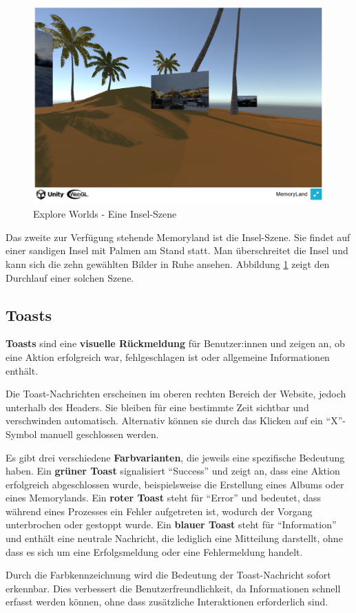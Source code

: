 \begin{figure} [h t]
    \centering
    \includegraphics[scale=0.5]{pics/explore_worlds_island.PNG}
    \caption{Explore Worlds - Eine Insel-Szene}
    \label{fig:explore-worlds-island}
\end{figure}



Das zweite zur Verfügung stehende Memoryland ist die Insel-Szene. Sie findet auf einer sandigen Insel mit Palmen am Stand statt. Man überschreitet die Insel und kann sich die zehn gewählten Bilder in Ruhe ansehen. Abbildung \ref{fig:explore-worlds-island} zeigt den Durchlauf einer solchen Szene.


\subsection{Toasts}

\textbf{Toasts} sind eine \textbf{visuelle Rückmeldung} für Benutzer:innen und zeigen an, ob eine Aktion erfolgreich war, fehlgeschlagen ist oder allgemeine Informationen enthält.  

Die Toast-Nachrichten erscheinen im oberen rechten Bereich der Website, jedoch unterhalb des Headers. Sie bleiben für eine bestimmte Zeit sichtbar und verschwinden automatisch. Alternativ können sie durch das Klicken auf ein ``X''-Symbol manuell geschlossen werden.  

Es gibt drei verschiedene \textbf{Farbvarianten}, die jeweils eine spezifische Bedeutung haben. Ein \textbf{grüner Toast} signalisiert ``Success'' und zeigt an, dass eine Aktion erfolgreich abgeschlossen wurde, beispielsweise die Erstellung eines Albums oder eines Memorylands. Ein \textbf{roter Toast} steht für ``Error'' und bedeutet, dass während eines Prozesses ein Fehler aufgetreten ist, wodurch der Vorgang unterbrochen oder gestoppt wurde. Ein \textbf{blauer Toast} steht für ``Information'' und enthält eine neutrale Nachricht, die lediglich eine Mitteilung darstellt, ohne dass es sich um eine Erfolgsmeldung oder eine Fehlermeldung handelt.


Durch die Farbkennzeichnung wird die Bedeutung der Toast-Nachricht sofort erkennbar. Dies verbessert die Benutzerfreundlichkeit, da Informationen schnell erfasst werden 
können, ohne dass zusätzliche Interaktionen erforderlich sind.




